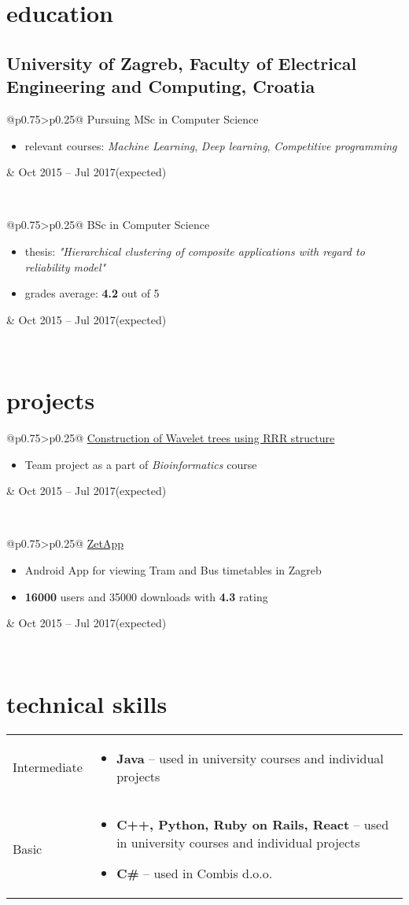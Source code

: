 \documentclass[a4paper]{article}
\makeatletter
\newlength{\tablewidth}
\newenvironment{period}[2]{%
\newcommand{\sarma}{#2}%
\setlength{\tablewidth}{\linewidth}
\addtolength{\tablewidth}{-2\tabcolsep}
\begin{tabular}{@{}p{0.75\tablewidth}>{\raggedleft\arraybackslash}p{0.25\tablewidth}@{}}%
#1 \newline
\begin{itemize}
}{%
\end{itemize} & \sarma \\%
\end{tabular}\\
}
\newenvironment{skills}{%
\setlength{\tablewidth}{\linewidth}
\addtolength{\tablewidth}{-2\tabcolsep}
\begin{tabular}{@{}p{0.1\tablewidth}p{0.9\tablewidth}@{}}
}{%
\end{tabular}
}
\makeatother
\begin{document}
\section{education}
\subsection{University of Zagreb, Faculty of Electrical Engineering and Computing, Croatia}
\begin{period}{Pursuing MSc in Computer Science}{Oct 2015 -- Jul 2017\linebreak(expected)}
    \item relevant courses:
        \textit{Machine Learning},
        \textit{Deep learning},
        \textit{Competitive programming}
\end{period}
\begin{period}{BSc in Computer Science}{Oct 2012 -- Jul 2015}
    \item thesis:
        \textit{"Hierarchical clustering of composite applications with regard to reliability model"}
    \item grades average: \textbf{4.2} out of 5
\end{period}

\section{projects}
\begin{period}{\href{https://github.com/mmagerl/bioinformatics-project}{Construction of Wavelet trees using RRR structure}}{Oct 2016 -- Jan 2017}
	\item 
		Team project as a part of \textit{Bioinformatics} course
\end{period}

\begin{period}{\href{http://tinyurl.com/zetapp}{ZetApp}}{Apr 2015}
	\item Android App for viewing Tram and Bus timetables in Zagreb
	\item \textbf{16000} users and 35000 downloads with \textbf{4.3} rating
\end{period}

\section{technical skills}
\begin{skills}
    Intermediate &
    \begin{itemize}
        \item \textbf{Java} -- used in university courses and individual projects
    \end{itemize} \\
    Basic &
    \begin{itemize}
        \item \textbf{C++, Python, Ruby on Rails, React} -- used in university courses and individual projects
        \item \textbf{C\#} -- used in Combis d.o.o.
    \end{itemize} \\
\end{skills}
\end{document}
